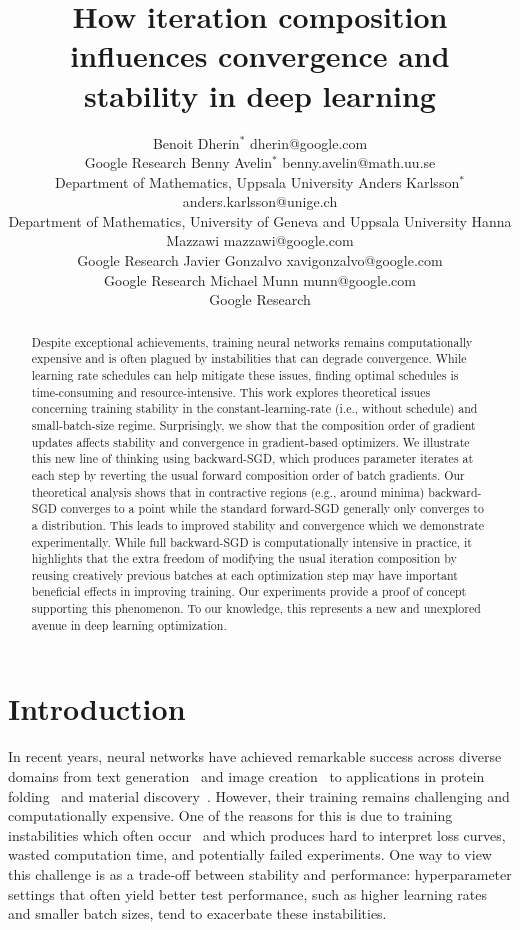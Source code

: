 \documentclass[10pt]{article} %
\title{How iteration composition influences convergence and stability in deep learning}
\author{\name Benoit Dherin$^*$ \email dherin@google.com \\
      \addr Google Research
      \AND
      \name Benny Avelin$^*$ \email benny.avelin@math.uu.se  \\
      \addr Department of Mathematics, Uppsala University
      \AND
      \name Anders Karlsson$^*$ \email anders.karlsson@unige.ch\\
      \addr Department of Mathematics, University of Geneva and Uppsala University
      \AND
      \name Hanna Mazzawi \email mazzawi@google.com\\
      \addr Google Research
      \AND
      \name Javier Gonzalvo \email xavigonzalvo@google.com\\
      \addr Google Research
      \AND
      \name Michael Munn \email munn@google.com\\
      \addr Google Research
}
\theoremstyle{plain}
\theoremstyle{definition}
\theoremstyle{remark}
\begin{document}
\maketitle

\def\thefootnote{*}
\def\thefootnote{\arabic{footnote}}

\begin{abstract}
Despite exceptional achievements, training neural networks remains computationally expensive and is often plagued by instabilities that can degrade convergence. While learning rate schedules can help mitigate these issues, finding optimal schedules is time-consuming and resource-intensive. This work explores theoretical issues concerning training stability in the constant-learning-rate (i.e., without schedule) and small-batch-size regime. 
Surprisingly, we show that the composition order of gradient updates affects stability and convergence in gradient-based optimizers.  We illustrate this new line of thinking using backward-SGD, which  produces parameter iterates at each step by reverting the usual forward composition order of batch gradients.
Our theoretical analysis shows that in contractive regions (e.g., around minima)  backward-SGD converges to a point while the standard forward-SGD generally only converges to a distribution. This leads to improved stability and convergence which we demonstrate experimentally. While full backward-SGD is computationally intensive in practice, it highlights that the extra freedom of modifying the usual iteration composition  by reusing creatively previous batches at each optimization step may have important beneficial effects in improving training. Our experiments provide a proof of concept supporting this phenomenon. To  our knowledge, this represents a new and unexplored avenue in deep learning optimization.
\end{abstract}

\section{Introduction}

In recent years, neural networks have achieved remarkable success across diverse domains from text generation~\cite{gemini152024, gemini2023, brown2020language} and image creation~\cite{ramesh2022hierarchical, ramesh2021zeroshot, saharia2022photorealistic} to applications in protein folding~\cite{jumper2021highly,jumper2021highlyaccurate} and material discovery~\cite{merchant2023scaling}. However, their training remains challenging and computationally expensive. One of the reasons for this is due to training instabilities which often occur~\mbox{\cite{wang2023exploring,li2019variance,cohen2021gradient,chen2018stability}} and which produces hard to interpret loss curves, wasted computation time, and potentially failed experiments. One way to view this  challenge is as a trade-off between stability and performance:  hyperparameter settings that often yield better test performance, such as higher learning rates and smaller batch sizes, tend to exacerbate these instabilities.
\end{document}
